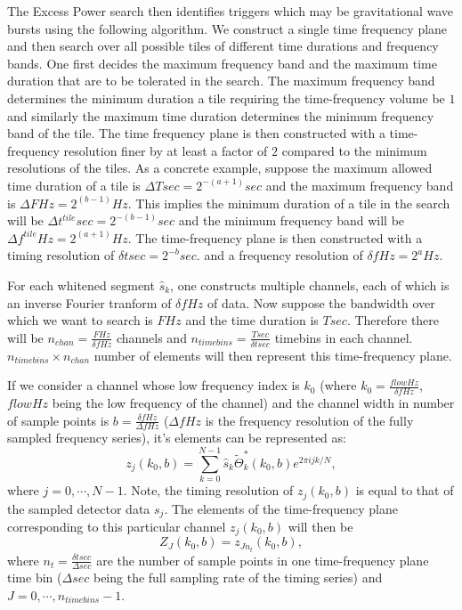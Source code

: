 The Excess Power search then identifies triggers which may be
gravitational wave bursts using the following algorithm.  
We construct a single
time frequency plane and then search over all possible tiles of different
time durations and frequency bands.  One first decides the maximum 
frequency band and the maximum time duration that are to be tolerated in
the search.  The maximum frequency band determines the minimum duration
a tile requiring the time-frequency volume be $1$ and 
similarly the maximum time duration determines the minimum frequency band
of the tile.  The time frequency plane is then constructed with a 
time-frequency resolution finer by at least a factor of $2$ compared to
the minimum resolutions of the tiles.  As a concrete example,  
suppose the maximum allowed time duration of a tile is 
$\Delta T sec = 2^{-(a+1)} sec$  and the maximum frequency band is 
$\Delta F Hz = 2^{(b-1)} Hz$.  This implies the minimum duration of a tile 
in the search will be  $\Delta t^{tile} sec = 2^{-(b-1)} sec$  and the 
minimum frequency band will be  $\Delta f^{tile} Hz = 2^{(a+1)} Hz$.
 The time-frequency plane is then constructed with a timing resolution
of $\delta t sec = 2^{-b} sec.$ and a frequency resolution of 
$\delta f Hz = 2^a Hz$.

For each whitened segment $\hat{s}_k$, one constructs multiple channels,  
each of which is an inverse Fourier tranform of $\delta f Hz$ of data.  
Now suppose the bandwidth over which we want to search is $ F Hz$ and the 
time duration is $ T sec $. Therefore there will be
$n_{chan} = \frac{ F Hz}{\delta f Hz}$ channels and $n_{timebins} 
= \frac{T sec}{ \delta t sec}$ timebins in each channel. 
$n_{timebins} \times n_{chan}$ number of elements will then represent 
this time-frequency plane.

If we consider a channel whose low frequency index is $k_0$ 
(where $k_0 = \frac{flow Hz}{ \delta f Hz}$,  $flow Hz$ being the low 
frequency of the channel) and the channel width in number of sample 
points is $ b = \frac{\delta f Hz }{\Delta f Hz} $ ($\Delta f Hz $ is the
 frequency resolution of the fully sampled frequency series),  it's elements 
can be represented as:
\begin{equation}
z_{j}(k_0,  b) = \sum_{k=0}^{N-1}  \hat{s}_k \tilde{\Theta}_k^\ast(k_0,  b) 
e^{2 \pi ijk/N},
\label{eq:tfplanecountspoints}
\end{equation}  where $j = 0,\cdots, N-1$.  Note,  the timing
resolution of $z_j(k_0,  b)$ is equal to that of the sampled detector 
data $s_j$.  The elements of the time-frequency plane corresponding to this 
particular channel $z_j(k_0,  b)$ will then be 
\begin{equation}
Z_J(k_0,  b)   = z_{Jn_t}(k_0,  b),
\end{equation} where $n_t = \frac{\delta t sec}{\Delta sec}$ are the number 
of sample points in one time-frequency plane time bin ($\Delta sec$ being 
the full sampling rate of the timing series)  and $J = 0, \cdots, 
n_{timebins} - 1$.

